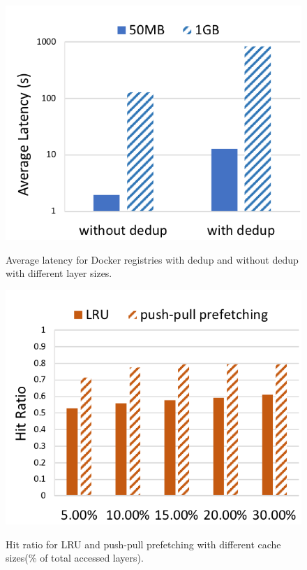 \begin{figure}[t]
	\centering
	\begin{minipage}{0.225\textwidth}
		\centering
		\includegraphics[width=1\textwidth]{graphs/avglatency_dedup_nodedup.png}
		\caption{Average latency for Docker registries with dedup and without dedup with different layer sizes.}
		\label{fig:avg_latency_dedup_nodedup}
	\end{minipage}
	\begin{minipage}{0.225\textwidth}
		\centering
		\includegraphics[width=1\textwidth]{graphs/lru_prefetch_hits.png}
		\caption{Hit ratio for LRU and push-pull prefetching with different cache sizes(\% of total accessed layers).}
		\vspace{-3pt}
		\label{fig:lru_prefetching_hits}
	\end{minipage}
\end{figure}